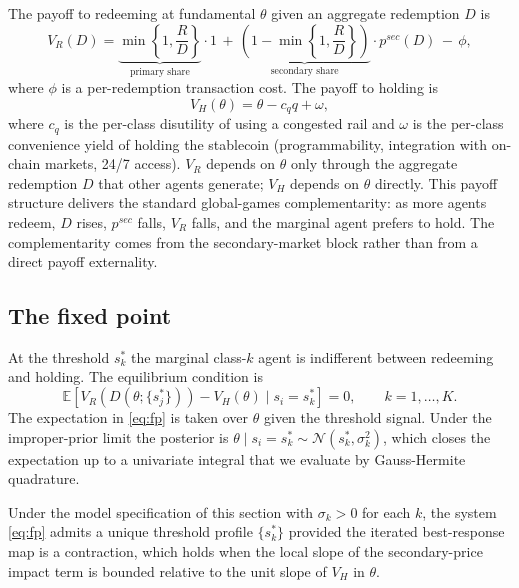 The payoff to redeeming at fundamental $\theta$ given an aggregate redemption $D$ is
\begin{equation}\label{eq:VR}
V_R(D) = \underbrace{\min\!\left\{1, \frac{R}{D}\right\}}_{\text{primary share}} \cdot 1 \, + \, \underbrace{\left(1 - \min\!\left\{1, \frac{R}{D}\right\}\right)}_{\text{secondary share}} \cdot p^{sec}(D) \, - \, \phi,
\end{equation}
where $\phi$ is a per-redemption transaction cost. The payoff to holding is
\begin{equation}\label{eq:VH}
V_H(\theta) = \theta - c_q q + \omega,
\end{equation}
where $c_q$ is the per-class disutility of using a congested rail and $\omega$ is the per-class convenience yield of holding the stablecoin (programmability, integration with on-chain markets, 24/7 access). $V_R$ depends on $\theta$ only through the aggregate redemption $D$ that other agents generate; $V_H$ depends on $\theta$ directly. This payoff structure delivers the standard global-games complementarity: as more agents redeem, $D$ rises, $p^{sec}$ falls, $V_R$ falls, and the marginal agent prefers to hold. The complementarity comes from the secondary-market block rather than from a direct payoff externality.

\subsection{The fixed point}\label{sub:fixedpoint}

At the threshold $s^*_k$ the marginal class-$k$ agent is indifferent between redeeming and holding. The equilibrium condition is
\begin{equation}\label{eq:fp}
\mathbb{E}\!\left[V_R(D(\theta; \{s^*_j\})) - V_H(\theta) \mid s_i = s^*_k\right] = 0, \qquad k = 1, \dots, K.
\end{equation}
The expectation in \eqref{eq:fp} is taken over $\theta$ given the threshold signal. Under the improper-prior limit the posterior is $\theta \mid s_i = s^*_k \sim \mathcal{N}(s^*_k, \sigma_k^2)$, which closes the expectation up to a univariate integral that we evaluate by Gauss-Hermite quadrature.

\begin{proposition}\label{prop:existence}
Under the model specification of this section with $\sigma_k > 0$ for each $k$, the system \eqref{eq:fp} admits a unique threshold profile $\{s^*_k\}$ provided the iterated best-response map is a contraction, which holds when the local slope of the secondary-price impact term is bounded relative to the unit slope of $V_H$ in $\theta$.
\end{proposition}


